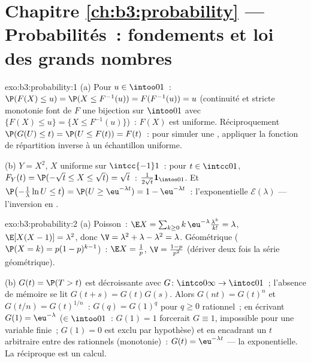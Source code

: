\section*{Chapitre \ref{ch:b3:probability} --- Probabilités~:
fondements et loi des grands nombres}

\begin{solution}{exo:b3:probability:1}
(a) Pour $u \in \intoo01$~: $\P(F(X) \leq u) = \P(X \leq
F^{-1}(u)) = F(F^{-1}(u)) = u$ (continuité et stricte
monotonie font de $F$ une bijection sur $\intoo01$ avec
$\{F(X) \leq u\} = \{X \leq F^{-1}(u)\}$)~: $F(X)$ est
uniforme. Réciproquement $\P(G(U) \leq t) = \P(U \leq F(t))
= F(t)$~: pour simuler une , appliquer la fonction de
répartition inverse à un échantillon uniforme.

(b) $Y = X^2$, $X$ uniforme sur $\intcc{-1}1$~: pour $t \in
\intcc01$, $F_Y(t) = \P(-\sqrt t \leq X \leq \sqrt t) =
\sqrt t$~:  $\frac1{2\sqrt t}\mathbf 1_{\intoo01}$.
Et $\P\bigl(-\frac1\lambda\ln U \leq t\bigr) = \P(U \geq
\eu^{-\lambda t}) = 1 - \eu^{-\lambda t}$~: l'exponentielle
$\mathcal E(\lambda)$ --- l'inversion en .
\end{solution}

\begin{solution}{exo:b3:probability:2}
(a) Poisson~: $\E X = \sum_{k\geq0}k\,\eu^{-\lambda}
\frac{\lambda^k}{k!} = \lambda$, $\E[X(X-1)] = \lambda^2$,
donc $\V = \lambda^2 + \lambda - \lambda^2 = \lambda$.
Géométrique ($\P(X = k) = p(1-p)^{k-1}$)~: $\E X =
\frac1p$, $\V = \frac{1-p}{p^2}$ (dériver deux fois la
série géométrique).

(b) $G(t) = \P(T > t)$ est décroissante avec $G \colon
\intco0\infty \to \intoc01$~; l'absence de mémoire se lit
$G(t + s) = G(t)G(s)$. Alors $G(n t) = G(t)^n$ et $G(t/n)
= G(t)^{1/n}$~: $G(q) = G(1)^q$ pour $q \geq 0$
rationnel~; en écrivant $G(1) = \eu^{-\lambda}$ ($\in
\intoo01$~: $G(1) = 1$ forcerait $G \equiv 1$, impossible
pour une variable finie~; $G(1) = 0$ est exclu par
hypothèse) et en encadrant un $t$ arbitraire entre des
rationnels (monotonie)~: $G(t) = \eu^{-\lambda t}$ --- la
 exponentielle. La réciproque est un calcul.
\end{solution}


